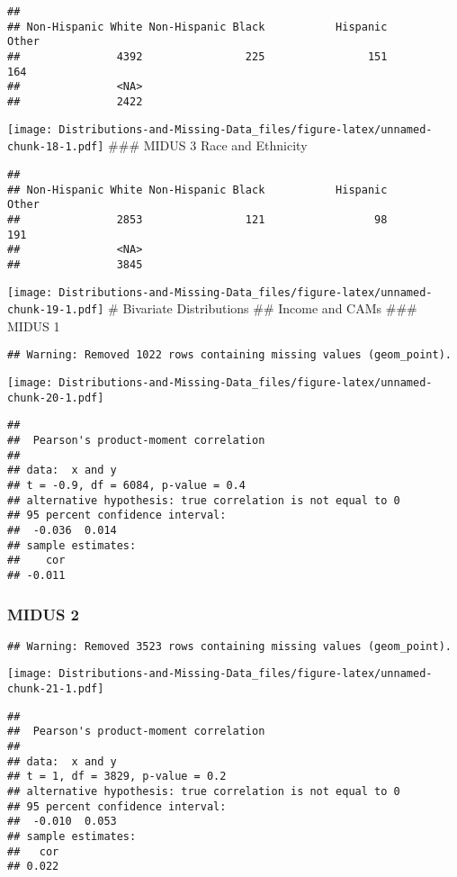 \documentclass[
]{article}
\begin{document}
\begin{verbatim}
## 
## Non-Hispanic White Non-Hispanic Black           Hispanic              Other 
##               4392                225                151                164 
##               <NA> 
##               2422
\end{verbatim}

\texttt{[image: Distributions-and-Missing-Data\_files/figure-latex/unnamed-chunk-18-1.pdf]}
\#\#\# MIDUS 3 Race and Ethnicity

\begin{verbatim}
## 
## Non-Hispanic White Non-Hispanic Black           Hispanic              Other 
##               2853                121                 98                191 
##               <NA> 
##               3845
\end{verbatim}

\texttt{[image: Distributions-and-Missing-Data\_files/figure-latex/unnamed-chunk-19-1.pdf]}
\# Bivariate Distributions \#\# Income and CAMs \#\#\# MIDUS 1

\begin{verbatim}
## Warning: Removed 1022 rows containing missing values (geom_point).
\end{verbatim}

\texttt{[image: Distributions-and-Missing-Data\_files/figure-latex/unnamed-chunk-20-1.pdf]}

\begin{verbatim}
## 
##  Pearson's product-moment correlation
## 
## data:  x and y
## t = -0.9, df = 6084, p-value = 0.4
## alternative hypothesis: true correlation is not equal to 0
## 95 percent confidence interval:
##  -0.036  0.014
## sample estimates:
##    cor 
## -0.011
\end{verbatim}

\hypertarget{midus-2}{%
\subsubsection{MIDUS 2}\label{midus-2}}

\begin{verbatim}
## Warning: Removed 3523 rows containing missing values (geom_point).
\end{verbatim}

\texttt{[image: Distributions-and-Missing-Data\_files/figure-latex/unnamed-chunk-21-1.pdf]}

\begin{verbatim}
## 
##  Pearson's product-moment correlation
## 
## data:  x and y
## t = 1, df = 3829, p-value = 0.2
## alternative hypothesis: true correlation is not equal to 0
## 95 percent confidence interval:
##  -0.010  0.053
## sample estimates:
##   cor 
## 0.022
\end{verbatim}
\end{document}
